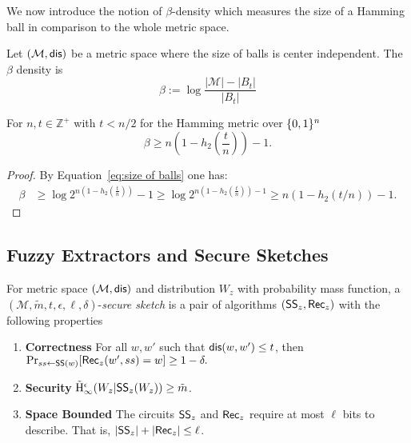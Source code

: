 \noindent
We now introduce the notion of $\beta$-density which measures the size of a Hamming ball in comparison to the whole metric space.
\begin{definition}
Let $(\mathcal{M}, \mathsf{dis})$ be a metric space where the size of balls is center independent.  The $\beta$ density is
\[
\beta := \log{\frac{|\mathcal{M}|- |B_t|}{|B_t|}} 
\]
\label{def:b density}
\end{definition}
\begin{claim} 
For $n, t\in \mathbb{Z}^+$ with $t<n/2$ for the Hamming metric over $\{0, 1\}^n$
\[
\beta \ge n\left(1-h_2\left(\frac{t}{n}\right)\right)-1.
\]

\end{claim}

\begin{proof}
By Equation~\ref{eq:size of balls} one has: 
\begin{align*}
\beta&\ge \log{2^{n\left(1-h_2\left(\frac{t}{n}\right)\right)} -1} \ge \log{2^{n\left(1-h_2\left(\frac{t}{n}\right)\right)-1} } \ge n(1-h_2(t/n))-1.
\end{align*}
\end{proof}


    \subsection{Fuzzy Extractors and Secure Sketches}
\begin{definition}
For metric space $(\mathcal{M}, \mathsf{dis})$ and distribution $W_z$ with probability mass function, a $(\mathcal{M}, \tilde{m}, t, \epsilon, \ell, \delta)$-\emph{secure sketch} is a pair of algorithms $({\mathsf{SS}}_z, {\mathsf{Rec}}_z)$ with the following properties 
\begin{enumerate} 
\itemsep0em
\item \textbf{Correctness} For all $w, w'$ such that $\mathsf{dis}(w, w')\le t$, then $\Pr_{ss \leftarrow {\ensuremath{\mathsf{SS}}}(w)}[{\mathsf{Rec}}_z(w', ss) = w]\ge 1-\delta.$
\item \textbf{Security}  $\tilde{\mathrm{H}}_\infty^\epsilon(W_z | {\mathsf{SS}}_z(W_z)) \ge \tilde{m}$.
\item \textbf{Space Bounded} The circuits ${\mathsf{SS}}_z$ and ${\mathsf{Rec}}_z$ require at most $\ell$ bits to describe.  That is, $|{\mathsf{SS}}_z| +|{\mathsf{Rec}}_z|\le \ell$.
\end{enumerate}
\end{definition}

